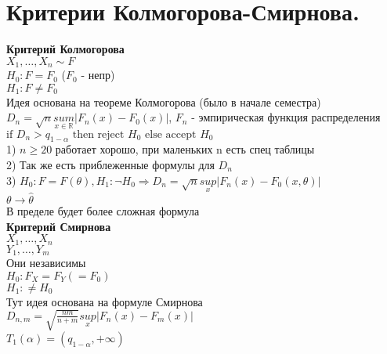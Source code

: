 \documentclass{article}
\newcommand\0{\mathbb{0}}
\newcommand\1{\mathbb{1}}
\renewcommand{\bf}{\textbf}
\newcommand{\Rto}{\Rightarrow}
\begin{document}
\section{Критерии Колмогорова-Смирнова.}
\bf{Критерий Колмогорова}\\
$X_1, \dots, X_n \sim F$\\
$H_0: F = F_0$ ($F_0$ - непр)\\
$H_1: F \neq F_0$\\
Идея основана на теореме Колмогорова (было в начале семестра)\\
$D_n = \sqrt{n}\underset{x \in \mathbb{R}}{sum}|F_n(x) - F_0(x)|$, $F_n$ - эмпирическая функция распределения\\
$\text{if }D_n > q_{1 - \alpha} \text{ then reject } H_0\text{ else accept } H_0$\\
1) $n \geq 20$ работает хорошо, при маленьких n есть спец таблицы\\
2) Так же есть приблеженные формулы для $D_n$\\
3) $H_0: F = F(\theta), H_1: \neg H_0 \Rto D_n = \sqrt{n}\underset{x}{sup}|F_n(x) - F_0(x, \theta)|$\\
$\theta \to \widehat{\theta}$\\
В пределе будет более сложная формула\\
\bf{Критерий Смирнова}\\
$X_1, \dots, X_n$\\
$Y_1, \dots, Y_m$\\
Они независимы\\
$H_0: F_X = F_Y (= F_0)$\\
$H_1: \neq H_0$\\
Тут идея основана на формуле Смирнова\\
$D_{n, m} = \sqrt{\frac{nm}{n + m}}\underset{x}{sup}|F_n(x) - F_m(x)|$\\
$T_1(\alpha) = (q_{1 - \alpha}, +\infty)$
\end{document}
